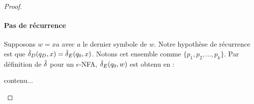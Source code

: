 \begin{proof}
	\paragraph{Pas de récurrence} Supposons $w=xa$ avec $a$ le dernier symbole de $w$. Notre hypothèse de récurrence est que $\hat{\delta}_D(q_D,x)=\hat{\delta}_E(q_0,x)$. Notons cet ensemble comme $\{p_1,p_2, \dots, p_k\}$. Par définition de $\hat{\delta}$ pour un $\epsilon$-NFA, $\hat{\delta}_E(q_0,w)$ est obtenu en :
	
	\begin{enumerate}
		contenu...
	\end{enumerate}
	
	
	
	
	
\end{proof}


